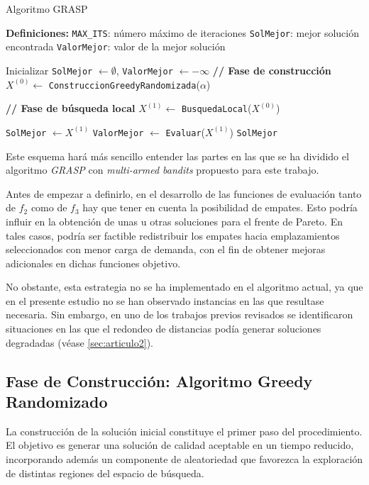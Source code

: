 \documentclass[12pt,a4paper]{book}
\begin{document}
\begin{algorithm}[H]
\caption{Algoritmo GRASP}
\begin{algorithmic}[1]
\Statex \textbf{Definiciones:}
\Statex \hspace{1em} \texttt{MAX\_ITS}: número máximo de iteraciones
\Statex \hspace{1em} \texttt{SolMejor}: mejor solución encontrada
\Statex \hspace{1em} \texttt{ValorMejor}: valor de la mejor solución

\Statex

\State Inicializar \texttt{SolMejor} $\gets \emptyset$, \texttt{ValorMejor} $\gets -\infty$
    \Statex \textbf{// Fase de construcción}
    \State $X^{(0)}\gets$ \texttt{ConstruccionGreedyRandomizada}($\alpha$)
    
    \Statex \textbf{// Fase de búsqueda local}
    \State $X^{(1)}\gets$ \texttt{BusquedaLocal}($X^{(0)}$)

        \State \texttt{SolMejor} $\gets X^{(1)}$
        \State \texttt{ValorMejor} $\gets$ \texttt{Evaluar}($X^{(1)}$)
    \EndIf
\EndFor
\State \Return \texttt{SolMejor}


\end{algorithmic}
\end{algorithm}

Este esquema hará más sencillo entender las partes en las que se ha dividido el algoritmo \textit{GRASP} con \textit{multi-armed bandits} propuesto para este trabajo.

Antes de empezar a definirlo, en el desarrollo de las funciones de evaluación tanto de $f_2$ como de $f_3$ hay que tener en cuenta la posibilidad de empates. Esto podría influir en la obtención de unas u otras soluciones para el frente de Pareto. 
En tales casos, podría ser factible redistribuir los empates hacia emplazamientos seleccionados con menor carga de demanda, con el fin de obtener mejoras adicionales en dichas funciones objetivo.  

No obstante, esta estrategia no se ha implementado en el algoritmo actual, ya que en el presente estudio no se han observado instancias en las que resultase necesaria. Sin embargo, en uno de los trabajos previos revisados se identificaron situaciones en las que el redondeo de distancias podía generar soluciones degradadas (véase \ref{sec:articulo2}).  

\subsection{Fase de Construcción: Algoritmo Greedy Randomizado}
La construcción de la solución inicial constituye el primer paso del procedimiento. El objetivo es generar una solución de calidad aceptable en un tiempo reducido, incorporando además un componente de aleatoriedad que favorezca la exploración de distintas regiones del espacio de búsqueda.  
\end{document}
